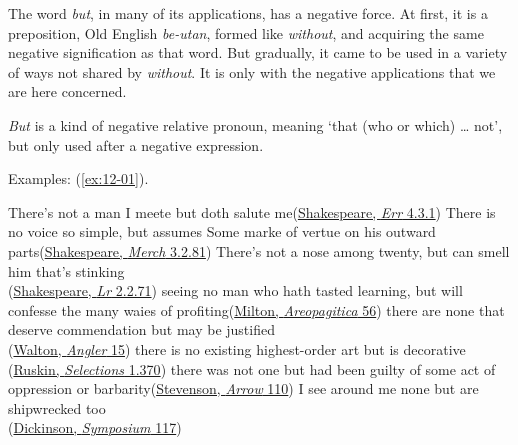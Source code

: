 \label{ch:12}

The word \textit{but}, in many of its applications, has a negative force. At first, it is a preposition, Old English \textit{be-utan}, formed like \textit{without}, and acquiring the same negative signification as that word. But gradually, it came to be used in a variety of ways not shared by \textit{without}. It is only with the negative applications that we are here concerned. 

\textit{But} is a kind of negative relative pronoun, meaning `that (who or which) {\dots} not', but only used after a negative expression.

Examples: (\ref{ex:12-01}).

\ea \label{ex:12-01}
\ea
There's not a man I meete but doth salute me\hfill(\href{https://internetshakespeare.uvic.ca/doc/Err_F1/scene/4.3/index.html}{Shakespeare, \textit{Err} 4.3.1})
\ex
There is no voice so simple, but assumes Some marke of vertue on his outward parts\hfill(\href{https://internetshakespeare.uvic.ca/doc/MV_F1/scene/3.2/index.html#tln-1425}{Shakespeare, \textit{Merch} 3.2.81}) %
\ex
There's not a nose among twenty, but can smell him that's stinking\\\hfill(\href{https://internetshakespeare.uvic.ca/doc/Lr_F1/scene/2.2/index.html#tln-1340}{Shakespeare, \textit{Lr} 2.2.71}) %
\ex
seeing no man who hath tasted learning, but will confesse the many waies of profiting\hfill(\href{https://archive.org/details/areopagitica00miltuoft/page/56/mode/2up?q=%22seeing+no+man+who+hath%22&view=theater}{Milton, \textit{Areopagitica} 56})
\ex
there are none that deserve commendation but may be justified\\\hfill(\href{https://archive.org/details/complangler00waltrich/page/38/mode/2up?q=%22deserve+commendation%22&view=theater}{Walton, \textit{Angler} 15})
\ex
there is no existing highest-order art but is decorative\\\hfill(\href{https://archive.org/details/selectionsfromwr0000rusk/page/286/mode/2up?q=%22no+existing%22&view=theater}{Ruskin, \textit{Selections} 1.370})
\ex
there was not one but had been guilty of some act of oppression or barbarity\hfill(\href{https://archive.org/details/blackarrowtaleof00stevrich/page/96/mode/2up?view=theater&q=%22there+was+not+one+but%22}{Stevenson, \textit{Arrow} 110}) %
\ex
I see around me none but are shipwrecked too\\\hfill(\href{https://www.gutenberg.org/files/30432/30432-h/30432-h.htm}{Dickinson, \textit{Symposium} 117})
\z
\z

